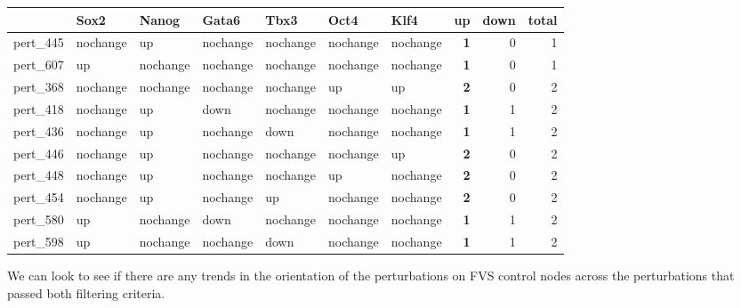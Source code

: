 \documentclass[
]{book}
\begin{document}
\begin{tabular}{l|l|l|l|l|l|l||>{}r|r|r}
\hline
  & Sox2 & Nanog & Gata6 & Tbx3 & Oct4 & Klf4 & up & down & total\\
\hline
pert\_445 & nochange & up & nochange & nochange & nochange & nochange & \textbf{1} & 0 & 1\\
\hline
pert\_607 & up & nochange & nochange & nochange & nochange & nochange & \textbf{1} & 0 & 1\\
\hline
pert\_368 & nochange & nochange & nochange & nochange & up & up & \textbf{2} & 0 & 2\\
\hline
pert\_418 & nochange & up & down & nochange & nochange & nochange & \textbf{1} & 1 & 2\\
\hline
pert\_436 & nochange & up & nochange & down & nochange & nochange & \textbf{1} & 1 & 2\\
\hline
pert\_446 & nochange & up & nochange & nochange & nochange & up & \textbf{2} & 0 & 2\\
\hline
pert\_448 & nochange & up & nochange & nochange & up & nochange & \textbf{2} & 0 & 2\\
\hline
pert\_454 & nochange & up & nochange & up & nochange & nochange & \textbf{2} & 0 & 2\\
\hline
pert\_580 & up & nochange & down & nochange & nochange & nochange & \textbf{1} & 1 & 2\\
\hline
pert\_598 & up & nochange & nochange & down & nochange & nochange & \textbf{1} & 1 & 2\\
\hline
\end{tabular}

We can look to see if there are any trends in the orientation of the perturbations on FVS control nodes across the perturbations that passed both filtering criteria.
\end{document}

